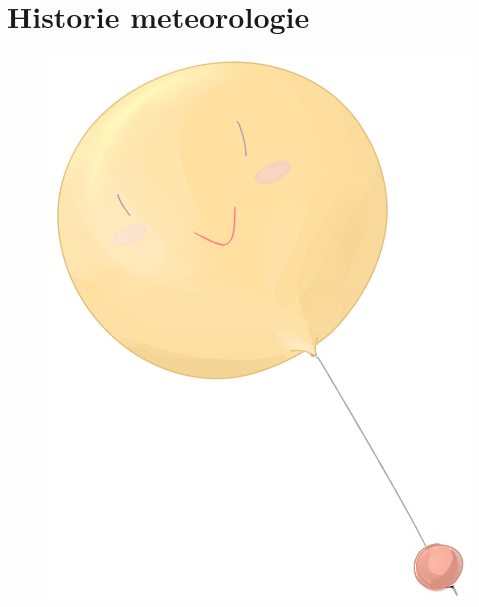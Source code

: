 \documentclass[11pt]{article}
\begin{document}
\section{Historie meteorologie}
%
\begin{figure}
 \centering
 \vspace{-2em}
 \href{https://www.youtube.com/watch?v=dQw4w9WgXcQ}{\includegraphics[scale=0.38]{resources/balon.png}}
\end{figure}

%
\par
%
\end{document}
